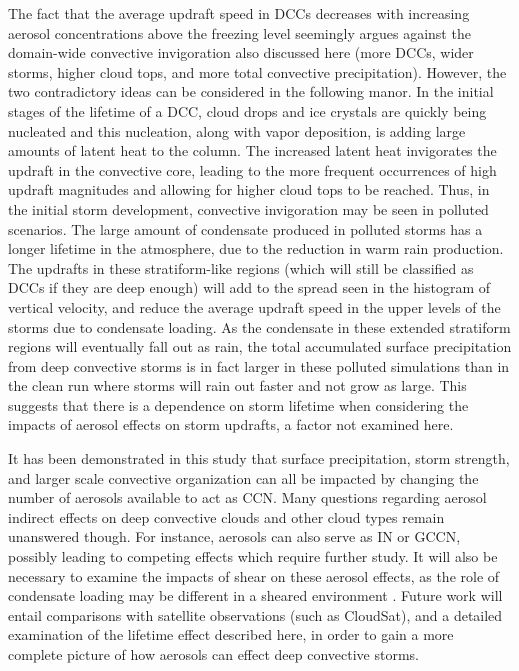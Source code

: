 The fact that the average updraft speed in DCCs decreases with increasing aerosol concentrations above the freezing level seemingly argues against the domain-wide convective invigoration also discussed here (more DCCs, wider storms, higher cloud tops, and more total convective precipitation).  However, the two contradictory ideas can be considered in the following manor.  In the initial stages of the lifetime of a DCC, cloud drops and ice crystals are quickly being nucleated and this nucleation, along with vapor deposition, is adding large amounts of latent heat to the column.  The increased latent heat invigorates the updraft in the convective core, leading to the more frequent occurrences of high updraft magnitudes and allowing for higher cloud tops to be reached.  Thus, in the initial storm development, convective invigoration may be seen in polluted scenarios.  The large amount of condensate produced in polluted storms has a longer lifetime in the atmosphere, due to the reduction in warm rain production.  The updrafts in these stratiform-like regions (which will still be classified as DCCs if they are deep enough) will add to the spread seen in the histogram of vertical velocity, and reduce the average updraft speed in the upper levels of the storms due to condensate loading.  As the condensate in these extended stratiform regions will eventually fall out as rain, the total accumulated surface precipitation from deep convective storms is in fact larger in these polluted simulations than in the clean run where storms will rain out faster and not grow as large.  This suggests that there is a dependence on storm lifetime when considering the impacts of aerosol effects on storm updrafts, a factor not examined here.

It has been demonstrated in this study that surface precipitation, storm strength, and larger scale convective organization can all be impacted by changing the number of aerosols available to act as CCN.  Many questions regarding aerosol indirect effects on deep convective clouds and other cloud types remain unanswered though.  For instance, aerosols can also serve as IN or GCCN, possibly leading to competing effects which require further study.  It will also be necessary to examine the impacts of shear on these aerosol effects, as the role of condensate loading may be different in a sheared environment \citep{nichollsshear}.  Future work will entail comparisons with satellite observations (such as CloudSat), and a detailed examination of the lifetime effect described here, in order to gain a more complete picture of how aerosols can effect deep convective storms.



